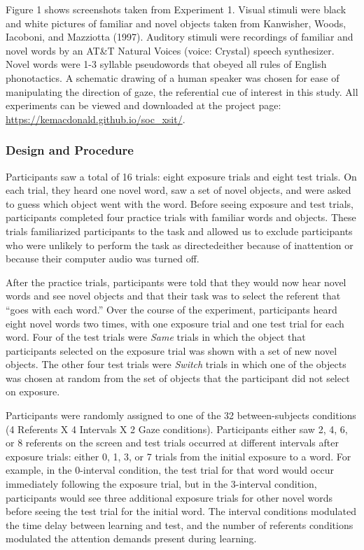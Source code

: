 \documentclass[authoryear, review]{elsarticle}
\providecommand{\DIFaddtex}[1]{{\protect\color{blue}\uwave{#1}}} %
\providecommand{\DIFaddbegin}{} %
\providecommand{\DIFaddend}{} %
\providecommand{\DIFadd}[1]{\texorpdfstring{\DIFaddtex{#1}}{#1}} %
\begin{document}
Figure 1 shows screenshots taken from Experiment 1. Visual stimuli were
black and white pictures of familiar and novel objects taken from
Kanwisher, Woods, Iacoboni, and Mazziotta (1997). Auditory stimuli were
recordings of familiar and novel words by an AT\&T Natural Voices
\texttrademark (voice: Crystal) speech synthesizer. Novel words were 1-3
syllable pseudowords that obeyed all rules of English phonotactics. A
schematic drawing of a human speaker was chosen for ease of manipulating
the direction of gaze, the referential cue of interest in this study.
All experiments can be viewed and downloaded at the project page:
\url{https://kemacdonald.github.io/soc_xsit/}.

\subsubsection{Design and Procedure}\label{design-and-procedure}

Participants saw a total of 16 trials: eight exposure trials and eight
test trials. On each trial, they heard one novel word, saw a set of
novel objects, and were asked to guess which object went with the word.
Before seeing exposure and test trials, participants completed four
practice trials with familiar words and objects. These trials
familiarized participants to the task and allowed us to exclude
participants who were unlikely to perform the task as directed\DIFaddbegin \DIFadd{, }\DIFaddend either
because of inattention or because their computer audio was turned off.

After the practice trials, participants were told that they would now
hear novel words and see novel objects and that their task was to select
the referent that ``goes with each word.'' Over the course of the
experiment, participants heard eight novel words two times, with one
exposure trial and one test trial for each word. Four of the test trials
were \emph{Same} trials in which the object that participants selected
on the exposure trial was shown with a set of new novel objects. The
other four test trials were \emph{Switch} trials in which one of the
objects was chosen at random from the set of objects that the
participant did not select on exposure.

Participants were randomly assigned to one of the 32 between-subjects
conditions (4 Referents X 4 Intervals X 2 Gaze conditions). Participants
either saw 2, 4, 6, or 8 referents on the screen and test trials
occurred at different intervals after exposure trials: either 0, 1, 3,
or 7 trials from the initial exposure to a word. For example, in the
0-interval condition, the test trial for that word would occur
immediately following the exposure trial, but in the 3-interval
condition, participants would see three additional exposure trials for
other novel words before seeing the test trial for the initial word. The
interval conditions modulated the time delay \DIFaddbegin \DIFadd{and the number of
intervening trials }\DIFaddend between learning and test, and the number of
referents conditions modulated the attention demands present during
learning.
\end{document}
